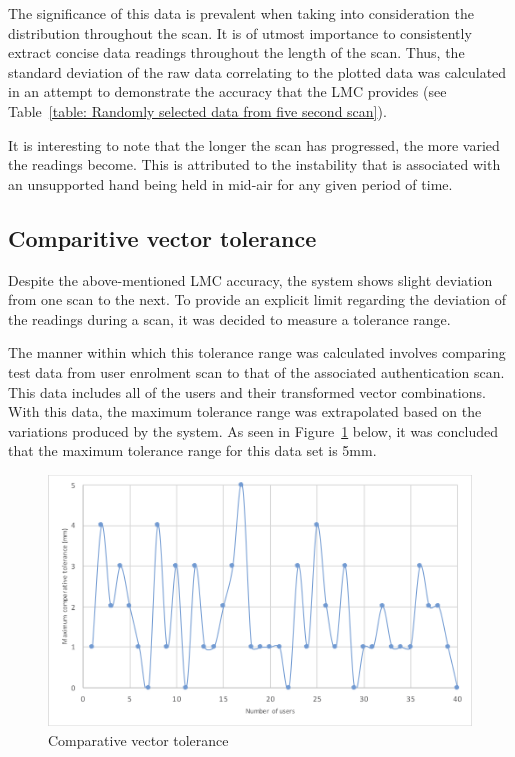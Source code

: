 The significance of this data is prevalent when taking into consideration the distribution throughout the scan. It is of utmost importance to consistently extract concise data readings throughout the length of the scan. Thus, the standard deviation of the raw data correlating to the plotted data was calculated in an attempt to demonstrate the accuracy that the LMC provides (see Table~\ref{table: Randomly selected data from five second scan}).

It is interesting to note that the longer the scan has progressed, the more varied the readings become. This is attributed to the instability that is associated with an unsupported hand being held in mid-air for any given period of time.

\subsection{Comparitive vector tolerance}

Despite the above-mentioned LMC accuracy, the system shows slight deviation from one scan to the next. To provide an explicit limit regarding the deviation of the readings during a scan, it was decided to measure a tolerance range.

The manner within which this tolerance range was calculated involves comparing test data from user enrolment scan to that of the associated authentication scan. This data includes all of the users and their transformed vector combinations. With this data, the maximum tolerance range was extrapolated based on the variations produced by the system. As seen in Figure~\ref{fig:Comparative vector tolerance} below, it was concluded that the maximum tolerance range for this data set is 5mm.

    
    \begin{figure}[htbp!] 
    \centering    
    \includegraphics[width=1.0\textwidth]{Chapter4/Figs/Comparative.png}
    \caption[Comparative vector tolerance]{Comparative vector tolerance}
    \label{fig:Comparative vector tolerance}
    \end{figure}

